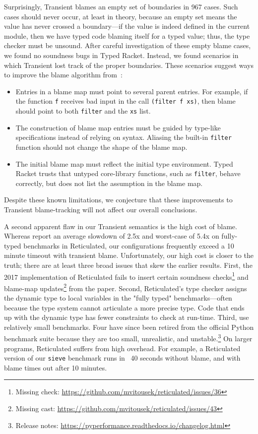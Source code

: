 Surprisingly, Transient blames an empty set of boundaries in 967 cases.
Such cases should never occur, at least in theory, because an empty set
 means the value has never crossed a boundary---if the value is indeed defined
 in the current module, then we have typed code blaming itself for a typed
 value; thus, the type checker must be unsound.
After careful investigation of these empty blame cases, we found no soundness
 bugs in Typed Racket.
Instead, we found scenarios in which Transient lost track of the proper
 boundaries.
These scenarios suggest ways to improve the blame algorithm from~\citet{vss-popl-2017}:
\begin{itemize}
  \item
    Entries in a blame map must point to several parent entries.
    For example, if the function \texttt{f} receives bad input in the call
    \texttt{(filter f xs)}, then blame should point to both \texttt{filter}
    and the \texttt{xs} list.
  \item
    The construction of blame map entries must be guided by type-like specifications
     instead of relying on syntax.
    Aliasing the built-in \texttt{filter} function should not change the shape
     of the blame map.
  \item
    The initial blame map must reflect the initial type environment.
    Typed Racket trusts that untyped core-library functions, such as \texttt{filter},
     behave correctly, but does not list the assumption in the blame map.
\end{itemize}
\noindent{}Despite these known limitations, we conjecture that these improvements
 to Transient blame-tracking will not affect our overall conclusions.

A second apparent flaw in our Transient semantics is the high cost of blame.
Whereas \citet{vss-popl-2017} report an average slowdown of 2.5x and
 worst-case of 5.4x on fully-typed benchmarks in Reticulated,
 our configurations frequently exceed a 10 minute timeout with transient blame.
Unfortunately, our high cost is closer to the truth;
 there are at least three broad issues that skew the earlier results.
First, the 2017 implementation of Reticulated fails to insert certain
 soundness checks\footnote{Missing check: \url{https://github.com/mvitousek/reticulated/issues/36}}
 and blame-map updates\footnote{Missing cast: \url{https://github.com/mvitousek/reticulated/issues/43}}
 from the paper.
Second, Reticulated's type checker assigns the dynamic type to local
 variables in the "fully typed" benchmarks---often because the type system
 cannot articulate a more precise type.
Code that ends up with the dynamic type has fewer constraints to check at run-time.
Third, \citet{vss-popl-2017} use relatively small benchmarks.
Four have since been retired from the official Python benchmark suite
 because they are too small, unrealistic, and unstable.\footnote{Release notes: \url{https://pyperformance.readthedocs.io/changelog.html}}
On larger programs, Reticulated suffers from high overhead.
For example, a Reticulated version of our \texttt{sieve} benchmark runs in
 ~40 seconds without blame, and with blame times out after 10 minutes.

